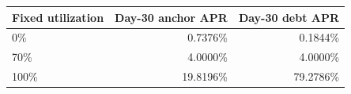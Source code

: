 \begin{center}
\begin{tabular}{@{}lrr@{}}
\toprule
Fixed utilization & Day-30 anchor APR & Day-30 debt APR \\
\midrule
0\% & 0.7376\% & 0.1844\% \\
70\% & 4.0000\% & 4.0000\% \\
100\% & 19.8196\% & 79.2786\% \\
\bottomrule
\end{tabular}
\end{center}

